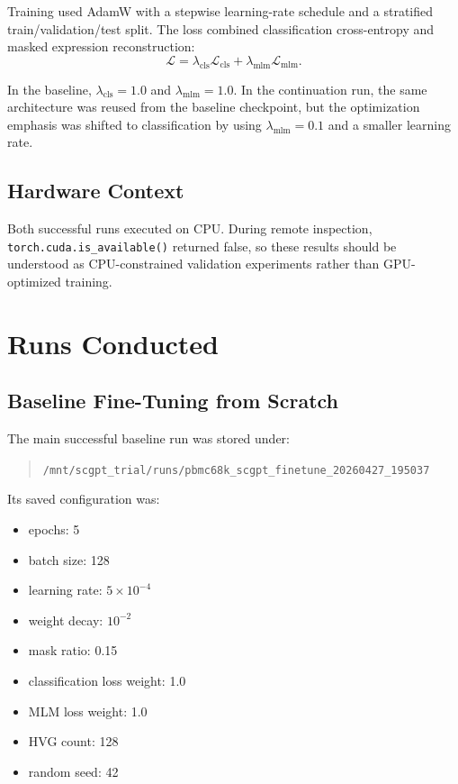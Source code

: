 \documentclass[11pt]{article}
\begin{document}
Training used AdamW with a stepwise learning-rate schedule and a stratified train/validation/test split. The loss combined classification cross-entropy and masked expression reconstruction:
\[
\mathcal{L} = \lambda_{\text{cls}}\mathcal{L}_{\text{cls}} + \lambda_{\text{mlm}}\mathcal{L}_{\text{mlm}}.
\]

In the baseline, $\lambda_{\text{cls}}=1.0$ and $\lambda_{\text{mlm}}=1.0$. In the continuation run, the same architecture was reused from the baseline checkpoint, but the optimization emphasis was shifted to classification by using $\lambda_{\text{mlm}}=0.1$ and a smaller learning rate.

\subsection{Hardware Context}
Both successful runs executed on CPU. During remote inspection, \texttt{torch.cuda.is\_available()} returned false, so these results should be understood as CPU-constrained validation experiments rather than GPU-optimized training.

\section{Runs Conducted}
\subsection{Baseline Fine-Tuning from Scratch}
The main successful baseline run was stored under:
\begin{quote}
\texttt{/mnt/scgpt\_trial/runs/pbmc68k\_scgpt\_finetune\_20260427\_195037}
\end{quote}

Its saved configuration was:
\begin{itemize}
    \item epochs: 5
    \item batch size: 128
    \item learning rate: $5\times 10^{-4}$
    \item weight decay: $10^{-2}$
    \item mask ratio: 0.15
    \item classification loss weight: 1.0
    \item MLM loss weight: 1.0
    \item HVG count: 128
    \item random seed: 42
\end{itemize}
\end{document}
